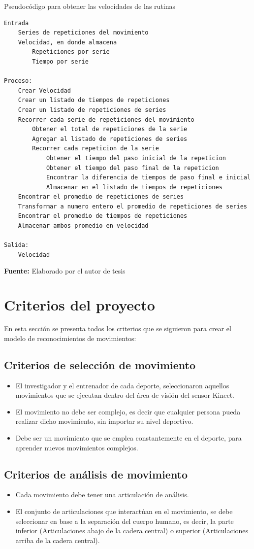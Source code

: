 \begin{code}[H]
	\caption{Pseudoc\'odigo para obtener las velocidades de las rutinas}
	\label{code:getTimeOfRepetitions}
	\begin{lstlisting}
Entrada
	Series de repeticiones del movimiento
	Velocidad, en donde almacena
		Repeticiones por serie
		Tiempo por serie
		
Proceso:
	Crear Velocidad
	Crear un listado de tiempos de repeticiones
	Crear un listado de repeticiones de series
	Recorrer cada serie de repeticiones del movimiento
		Obtener el total de repeticiones de la serie
		Agregar al listado de repeticiones de series
		Recorrer cada repeticion de la serie
			Obtener el tiempo del paso inicial de la repeticion
			Obtener el tiempo del paso final de la repeticion
			Encontrar la diferencia de tiempos de paso final e inicial
			Almacenar en el listado de tiempos de repeticiones
	Encontrar el promedio de repeticiones de series
	Transformar a numero entero el promedio de repeticiones de series
	Encontrar el promedio de tiempos de repeticiones
	Almacenar ambos promedio en velocidad
	
Salida:
	Velocidad
	\end{lstlisting}
	\textbf{Fuente:} Elaborado por el autor de tesis
\end{code} 
\section{Criterios del proyecto}\label{criter}
En esta secci\'on se presenta todos los criterios que se siguieron para crear el modelo de reconocimientos de movimientos:
\subsection{Criterios de selecci\'on de movimiento}
\begin{itemize}
	\item El investigador y el entrenador de cada deporte,  seleccionaron aquellos movimientos que se ejecutan dentro del \'area de visi\'on del sensor Kinect.
	\item El movimiento no debe ser complejo, es decir que cualquier persona pueda realizar dicho movimiento, sin importar su nivel deportivo.
	\item Debe ser un movimiento que se emplea constantemente en el deporte, para aprender nuevos movimientos complejos.
\end{itemize}
\subsection{Criterios de an\'alisis de movimiento}
\begin{itemize}
	\item Cada movimiento debe tener una articulaci\'on de an\'alisis.
	\item El conjunto de articulaciones que interact\'uan en el movimiento, se debe seleccionar en base a la separaci\'on del cuerpo humano, es decir, la parte inferior (Articulaciones abajo de la cadera central) o superior (Articulaciones arriba de la cadera central).
\end{itemize}
